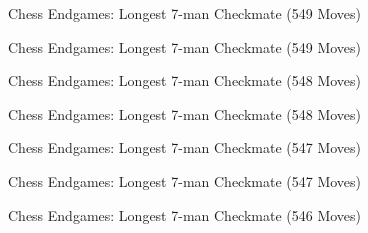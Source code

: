 \documentclass{beamer}
\theoremstyle{definition}
\begin{document}
  {
    \def\chessTitle{Chess Endgames: Longest 7-man Checkmate }
    \begin{frame}{\chessTitle (549 Moves)}
      \begin{figure}[H]
        \centering
        \newgame
        \showboard
      \end{figure}
    \end{frame}

    \begin{frame}{\chessTitle (549 Moves)}
      \begin{figure}[H]
        \centering
        \showboard
      \end{figure}
    \end{frame}

    \begin{frame}{\chessTitle (548 Moves)}
      \begin{figure}[H]
        \centering
        \showboard
      \end{figure}
    \end{frame}

    \begin{frame}{\chessTitle (548 Moves)}
      \begin{figure}[H]
        \centering
        \showboard
      \end{figure}
    \end{frame}

    \begin{frame}{\chessTitle (547 Moves)}
      \begin{figure}[H]
        \centering
        \showboard
      \end{figure}
    \end{frame}

    \begin{frame}{\chessTitle (547 Moves)}
      \begin{figure}[H]
        \centering
        \showboard
      \end{figure}
    \end{frame}

    \begin{frame}{\chessTitle (546 Moves)}
      \begin{figure}[H]
        \centering
        \showboard
      \end{figure}
    \end{frame}

}
\end{document}

